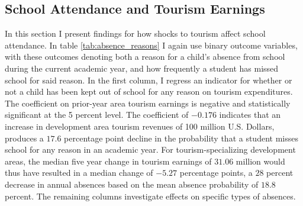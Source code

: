 \documentclass[12pt]{article}
\begin{document}
		
		


	\subsection{School Attendance and Tourism Earnings}
	\label{subsec:attendance}


	In this section I present findings for how shocks to tourism affect school attendance. In table \ref{tab:absence_reasons} I again use binary outcome variables, with these outcomes denoting both a reason for a child's absence from school during the current academic year, and how frequently a student has missed school for said reason. In the first column, I regress an indicator for whether or not a child has been kept out of school for any reason on tourism expenditures. The coefficient on prior-year area tourism earnings is negative and statistically significant at the 5 percent level. The coefficient of $-0.176$ indicates that an increase in development area tourism revenues of 100 million U.S. Dollars, produces a $17.6$ percentage point decline in the probability that a student misses school for any reason in an academic year. For tourism-specializing development areas, the median five year change in tourism earnings of $31.06$ million would thus have resulted in a median change of $-5.27$ percentage points, a $28$ percent decrease in annual absences based on the mean absence probability of $18.8$ percent. The remaining columns investigate effects on specific types of absences.
	
\end{document}
